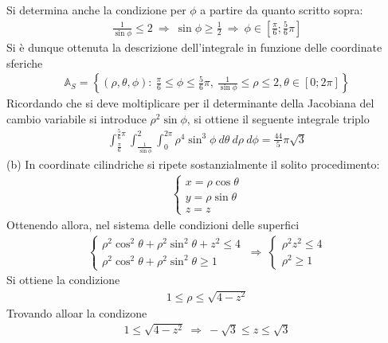 \documentclass[a4paper, oneside]{book}
\begin{document}
Si determina anche la condizione per $\phi$ a partire da quanto scritto sopra:
\begin{gather*}
    \frac{1}{\sin\phi} \leq 2 \ \Longrightarrow \ \sin\phi \geq \frac{1}{2} \ \Longrightarrow \ \phi \in \left[\frac{\pi}{6}; \frac{5}{6}\pi\right]
\end{gather*}
Si è dunque ottenuta la descrizione dell'integrale in funzione delle coordinate sferiche
\begin{gather*}
    \mathbb{A}_S = \left\{(\rho, \theta, \phi) : \ \frac{\pi}{6} \leq \phi \leq \frac{5}{6}\pi, \ \frac{1}{\sin\phi} \leq \rho \leq 2,  \theta \in [0; 2\pi]\right\}
\end{gather*}
Ricordando che si deve moltiplicare per il determinante della Jacobiana 
del cambio variabile si introduce $\rho^{2}\sin\phi$, si ottiene il seguente integrale triplo
\begin{gather*}
    \int_{\frac{\pi}{6}}^{\frac{5}{6}\pi} \int_{\frac{1}{\sin\phi}}^{2}\int_{0}^{2\pi} \rho^{4}\sin^{3}\phi \ d\theta \ d\rho \ d\phi     = \frac{44}{5}\pi \sqrt{3} 
\end{gather*}
(b) In coordinate cilindriche si ripete sostanzialmente il solito procedimento:
\begin{gather*}
    \left\{\begin{array}{l}
        x = \rho\cos\theta \\
    y = \rho\sin\theta \\
    z = z
    \end{array}\right.
\end{gather*} 
Ottenendo allora, nel sistema delle condizioni delle superfici
\begin{gather*}
    \left\{\begin{array}{l}
        \rho^{2}\cos^{2}\theta + \rho^{2}\sin^{2}\theta + z^{2} \leq 4 \\
        \rho^{2}\cos^{2}\theta + \rho^{2}\sin^{2}\theta \geq 1
    \end{array}\right. \ \Longrightarrow \ 
    \left\{\begin{array}{l}
        \rho^{2}  z^{2} \leq 4 \\
        \rho^{2} \geq 1 
    \end{array}\right.
\end{gather*}
Si ottiene la condizione 
\begin{gather*}
    1 \leq \rho \leq \sqrt{4 - z^{2}} 
\end{gather*}
Trovando alloar la condizone 
\begin{gather*}
    1 \leq \sqrt{4 - z^{2}} \ \Longrightarrow \ -\sqrt{3} \leq z \leq \sqrt{3}   
\end{gather*}
\end{document}
